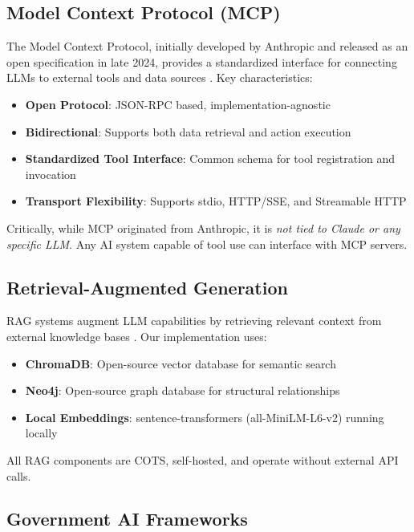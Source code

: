 \documentclass[11pt,twocolumn]{article}
\begin{document}
\subsection{Model Context Protocol (MCP)}

The Model Context Protocol, initially developed by Anthropic and released as an open specification in late 2024, provides a standardized interface for connecting LLMs to external tools and data sources \cite{mcp2024}. Key characteristics:

\begin{itemize}
    \item \textbf{Open Protocol}: JSON-RPC based, implementation-agnostic
    \item \textbf{Bidirectional}: Supports both data retrieval and action execution
    \item \textbf{Standardized Tool Interface}: Common schema for tool registration and invocation
    \item \textbf{Transport Flexibility}: Supports stdio, HTTP/SSE, and Streamable HTTP
\end{itemize}

Critically, while MCP originated from Anthropic, it is \textit{not tied to Claude or any specific LLM}. Any AI system capable of tool use can interface with MCP servers.

\subsection{Retrieval-Augmented Generation}

RAG systems augment LLM capabilities by retrieving relevant context from external knowledge bases \cite{lewis2020}. Our implementation uses:

\begin{itemize}
    \item \textbf{ChromaDB}: Open-source vector database for semantic search
    \item \textbf{Neo4j}: Open-source graph database for structural relationships
    \item \textbf{Local Embeddings}: sentence-transformers (all-MiniLM-L6-v2) running locally
\end{itemize}

All RAG components are COTS, self-hosted, and operate without external API calls.

\subsection{Government AI Frameworks}
\end{document}
